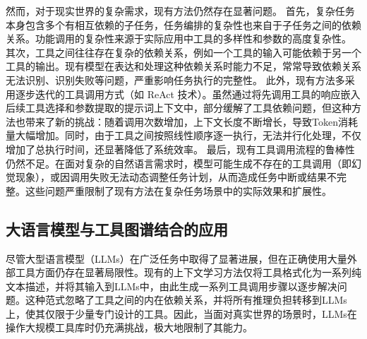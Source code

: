 
然而，对于现实世界的复杂需求，现有方法仍然存在显著问题。
首先，复杂任务本身包含多个有相互依赖的子任务，任务编排的复杂性也来自于子任务之间的依赖关系。功能调用的复杂性来源于实际应用中工具的多样性和参数的高度复杂性。
其次，工具之间往往存在复杂的依赖关系，例如一个工具的输入可能依赖于另一个工具的输出。现有模型在表达和处理这种依赖关系时能力不足，常常导致依赖关系无法识别、识别失败等问题，严重影响任务执行的完整性。
此外，现有方法多采用逐步迭代的工具调用方式（如 ReAct 技术\cite{Yao2023b}）。虽然通过将先调用工具的响应嵌入后续工具选择和参数提取的提示词上下文中，部分缓解了工具依赖问题，但这种方法也带来了新的挑战：随着调用次数增加，上下文长度不断增长，导致Token消耗量大幅增加。同时，由于工具之间按照线性顺序逐一执行，无法并行化处理，不仅增加了总执行时间，还显著降低了系统效率。
最后，现有工具调用流程的鲁棒性仍然不足。在面对复杂的自然语言需求时，模型可能生成不存在的工具调用（即幻觉现象），或因调用失败无法动态调整任务计划，从而造成任务中断或结果不完整。这些问题严重限制了现有方法在复杂任务场景中的实际效果和扩展性。

\subsection{大语言模型与工具图谱结合的应用}





尽管大型语言模型（LLMs）在广泛任务中取得了显著进展，但在正确使用大量外部工具方面仍存在显著局限性。现有的上下文学习方法仅将工具格式化为一系列纯文本描述，并将其输入到LLMs中，由此生成一系列工具调用步骤以逐步解决问题。这种范式忽略了工具之间的内在依赖关系，并将所有推理负担转移到LLMs上，使其仅限于少量专门设计的工具。因此，当面对真实世界的场景时，LLMs在操作大规模工具库时仍充满挑战，极大地限制了其能力。

